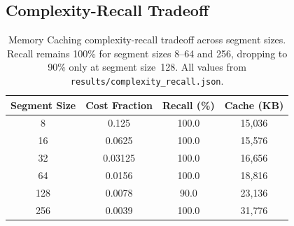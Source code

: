 \subsection{Complexity-Recall Tradeoff}

\begin{table}[H]
\centering
\caption{Memory Caching complexity-recall tradeoff across segment sizes.
Recall remains 100\% for segment sizes 8--64 and 256, dropping to 90\%
only at segment size~128.
All values from \texttt{results/complexity\_recall.json}.}
\label{tab:complexity}
\small
\begin{tabular}{@{}cccc@{}}
\toprule
\textbf{Segment Size} & \textbf{Cost Fraction}
  & \textbf{Recall (\%)} & \textbf{Cache (KB)} \\
\midrule
8   & 0.125   & 100.0 & 15{,}036 \\
16  & 0.0625  & 100.0 & 15{,}576 \\
32  & 0.03125 & 100.0 & 16{,}656 \\
64  & 0.0156  & 100.0 & 18{,}816 \\
128 & 0.0078  &  90.0 & 23{,}136 \\
256 & 0.0039  & 100.0 & 31{,}776 \\
\bottomrule
\end{tabular}
\end{table}
